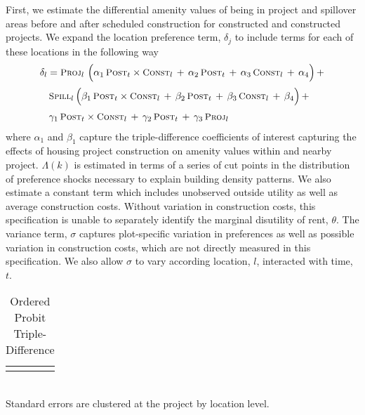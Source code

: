 \documentclass[12pt]{article}
\begin{document}
First, we estimate the differential amenity values of being in project and spillover areas before and after scheduled construction for constructed and constructed projects.  We expand the location preference term, $\delta_j$ to include terms for each of these locations in the following way
\begin{align*}
\delta_l &= \textsc{\small Proj}_{l} \,\, \Big( \alpha_1 \, \textsc{\small Post}_{t}\times\textsc{\small Const}_{l} \, + \, \alpha_2 \, \textsc{\small Post}_{t} \, + \, \alpha_3 \, \textsc{\small Const}_{l}\, +\, \alpha_4 \Big) \, + \\[.2em]
& \, \textsc{\small Spill}_{l} \, \Big( \beta_1 \, \textsc{\small Post}_{t}\times\textsc{\small Const}_{l} \, + \, \beta_2 \, \textsc{\small Post}_{t} \, + \, \beta_3 \, \textsc{\small Const}_{l} \, +\, \beta_4 \Big) \, + \\[.2em]
& \, \gamma_1 \,  \textsc{\small Post}_{t}\times\textsc{\small Const}_{l} \, + \, \gamma_2 \,\textsc{\small Post}_{t} \, + \, \gamma_3 \,  \textsc{\small Proj}_{l}
\end{align*}
\noindent where $\alpha_1$ and $\beta_1$ capture the triple-difference coefficients of interest capturing the effects of housing project construction on amenity values within and nearby project.  $\Lambda(k)$ is estimated in terms of a series of cut points in the distribution of preference shocks necessary to explain building density patterns.  We also estimate a constant term which includes unobserved outside utility as well as average construction costs.  Without variation in construction costs, this specification is unable to separately identify the marginal disutility of rent, $\theta$.  The variance term, $\sigma$ captures plot-specific variation in preferences as well as possible variation in construction costs, which are not directly measured in this specification.  We also allow $\sigma$ to vary according location, $l$, interacted with time, $t$.  


\begin{table}[h]
\centering
\caption{Ordered Probit Triple-Difference}\label{table:mainestfull_output}
\vspace{-2mm}
\begin{tabular}{lDD}
\toprule

% 

\bottomrule\\[-.6em]
\end{tabular}\\
Standard errors are clustered at the project by location level.  
\end{table}
\end{document}
